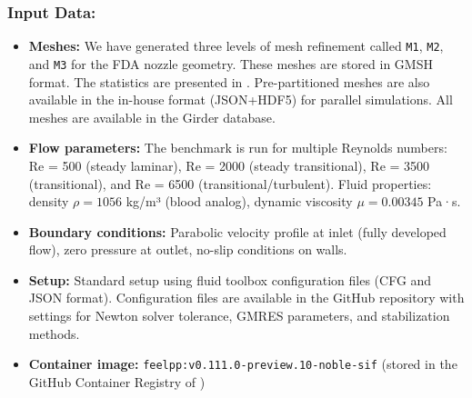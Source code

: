 \subsubsection{Input Data:}
  \begin{itemize}
  \item \textbf{Meshes:} We have generated three levels of mesh refinement called \texttt{M1}, \texttt{M2}, and \texttt{M3} for the FDA nozzle geometry. These meshes are stored in GMSH format. The statistics are presented in . Pre-partitioned meshes are also available in the \Feelpp in-house format (JSON+HDF5) for parallel simulations. All meshes are available in the \Feelpp Girder database.
  
  \item \textbf{Flow parameters:} The benchmark is run for multiple Reynolds numbers: Re = 500 (steady laminar), Re = 2000 (steady transitional), Re = 3500 (transitional), and Re = 6500 (transitional/turbulent). Fluid properties: density $\rho = 1056$ kg/m³ (blood analog), dynamic viscosity $\mu = 0.00345$ Pa·s.
  
  \item \textbf{Boundary conditions:} Parabolic velocity profile at inlet (fully developed flow), zero pressure at outlet, no-slip conditions on walls.
  
  \item \textbf{Setup:} Standard setup using \Feelpp fluid toolbox configuration files (CFG and JSON format). Configuration files are available in the \Feelpp GitHub repository with settings for Newton solver tolerance, GMRES parameters, and stabilization methods.
  
  \item \textbf{Container image:} \texttt{feelpp:v0.111.0-preview.10-noble-sif} (stored in the GitHub Container Registry of \Feelpp)
  \end{itemize}

